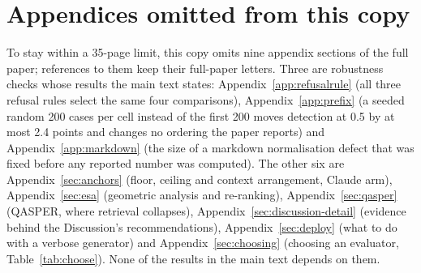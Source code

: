 \documentclass[11pt]{article}
\newcommand{\movedsub}[1]{\section{#1}}     %
\newcommand{\movedsub}[1]{\subsection{#1}}
\newcommand{\appendixinput}[1]{{\renewcommand{\movedsub}[1]{\section{##1}}}}
\begin{document}
\section*{Appendices omitted from this copy}
To stay within a 35-page limit, this copy omits nine appendix sections of the full paper; references to them keep their full-paper letters. Three are robustness checks whose results the main text states: Appendix~\ref{app:refusalrule} (all three refusal rules select the same four comparisons), Appendix~\ref{app:prefix} (a seeded random 200 cases per cell instead of the first 200 moves detection at 0.5 by at most 2.4 points and changes no ordering the paper reports) and Appendix~\ref{app:markdown} (the size of a markdown normalisation defect that was fixed before any reported number was computed). The other six are Appendix~\ref{sec:anchors} (floor, ceiling and context arrangement, Claude arm), Appendix~\ref{sec:esa} (geometric analysis and re-ranking), Appendix~\ref{sec:qasper} (QASPER, where retrieval collapses), Appendix~\ref{sec:discussion-detail} (evidence behind the Discussion's recommendations), Appendix~\ref{sec:deploy} (what to do with a verbose generator) and Appendix~\ref{sec:choosing} (choosing an evaluator, Table~\ref{tab:choose}). None of the results in the main text depends on them.
\else
\appendixinput{sections/anchors}
\appendixinput{sections/esa}
\appendixinput{sections/qasper}
\ifnum{}
  
\fi
\appendixinput{sections/discussion-detail}
\appendixinput{sections/deploy}
\appendixinput{sections/choosing}
\fi
\end{document}
